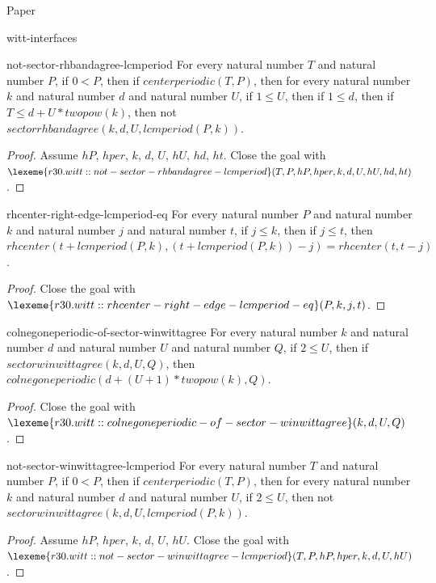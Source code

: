 \begin{lexlean}{Paper}
\begin{section}{witt-interfaces}
  \begin{theorem}{not-sector-rhbandagree-lcmperiod}
  For every natural number \(T\) and natural number \(P\), if \(0 < P\), then if \(centerperiodic(T, P)\), then for every natural number \(k\) and natural number \(d\) and natural number \(U\), if \(1 ≤ U\), then if \(1 ≤ d\), then if \(T ≤ d + U * twopow(k)\), then not \(sectorrhbandagree(k, d, U, lcmperiod(P, k))\).
  \begin{proof}
  Assume \(hP\), \(hper\), \(k\), \(d\), \(U\), \(hU\), \(hd\), \(ht\).
  Close the goal with \(\lexeme{r30.witt::not-sector-rhbandagree-lcmperiod}(T, P, hP, hper, k, d, U, hU, hd, ht)\).
  \end{proof}
  \end{theorem}

  \begin{theorem}{rhcenter-right-edge-lcmperiod-eq}
  For every natural number \(P\) and natural number \(k\) and natural number \(j\) and natural number \(t\), if \(j ≤ k\), then if \(j ≤ t\), then \(rhcenter(t + lcmperiod(P, k), (t + lcmperiod(P, k)) - j) = rhcenter(t, t - j)\).
  \begin{proof}
  Close the goal with \(\lexeme{r30.witt::rhcenter-right-edge-lcmperiod-eq}(P, k, j, t)\).
  \end{proof}
  \end{theorem}

  \begin{theorem}{colnegoneperiodic-of-sector-winwittagree}
  For every natural number \(k\) and natural number \(d\) and natural number \(U\) and natural number \(Q\), if \(2 ≤ U\), then if \(sectorwinwittagree(k, d, U, Q)\), then \(colnegoneperiodic(d + (U + 1) * twopow(k), Q)\).
  \begin{proof}
  Close the goal with \(\lexeme{r30.witt::colnegoneperiodic-of-sector-winwittagree}(k, d, U, Q)\).
  \end{proof}
  \end{theorem}

  \begin{theorem}{not-sector-winwittagree-lcmperiod}
  For every natural number \(T\) and natural number \(P\), if \(0 < P\), then if \(centerperiodic(T, P)\), then for every natural number \(k\) and natural number \(d\) and natural number \(U\), if \(2 ≤ U\), then not \(sectorwinwittagree(k, d, U, lcmperiod(P, k))\).
  \begin{proof}
  Assume \(hP\), \(hper\), \(k\), \(d\), \(U\), \(hU\).
  Close the goal with \(\lexeme{r30.witt::not-sector-winwittagree-lcmperiod}(T, P, hP, hper, k, d, U, hU)\).
  \end{proof}
  \end{theorem}


\end{section}
\end{lexlean}
